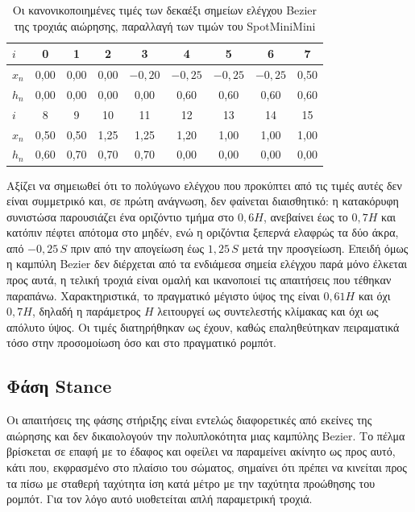 \documentclass[11pt]{report}
\begin{document}
\begin{table}[htbp]
    \centering
    \small
    \setlength{\tabcolsep}{4pt}
    \begin{tabular}{@{}l *{8}{c}@{}}
        \toprule
        $i$ & 0 & 1 & 2 & 3 & 4 & 5 & 6 & 7 \\
        \midrule
        $x_n$ & 0,00 & 0,00 & 0,00 & $-0{,}20$ & $-0{,}25$ & $-0{,}25$ & $-0{,}25$ & 0,50 \\
        $h_n$ & 0,00 & 0,00 & 0,00 & 0,00 & 0,60 & 0,60 & 0,60 & 0,60 \\
        \midrule
        $i$ & 8 & 9 & 10 & 11 & 12 & 13 & 14 & 15 \\
        \midrule
        $x_n$ & 0,50 & 0,50 & 1,25 & 1,25 & 1,20 & 1,00 & 1,00 & 1,00 \\
        $h_n$ & 0,60 & 0,70 & 0,70 & 0,70 & 0,00 & 0,00 & 0,00 & 0,00 \\
        \bottomrule
    \end{tabular}
    \caption[Κανονικοποιημένα σημεία ελέγχου Bezier της τροχιάς αιώρησης]{Οι
    κανονικοποιημένες τιμές των δεκαέξι σημείων ελέγχου Bezier της τροχιάς
    αιώρησης, παραλλαγή των τιμών του SpotMiniMini
    \cite{spotminimini2020github}}
    \label{tab:bezier-control-values}
\end{table}

Αξίζει να σημειωθεί ότι το πολύγωνο ελέγχου που προκύπτει από τις τιμές αυτές
δεν είναι συμμετρικό και, σε πρώτη ανάγνωση, δεν φαίνεται διαισθητικό: η
κατακόρυφη συνιστώσα παρουσιάζει ένα οριζόντιο τμήμα στο $0{,}6H$, ανεβαίνει
έως το $0{,}7H$ και κατόπιν πέφτει απότομα στο μηδέν, ενώ η οριζόντια ξεπερνά
ελαφρώς τα δύο άκρα, από $-0{,}25\,S$ πριν από την απογείωση έως $1{,}25\,S$ μετά
την προσγείωση. Επειδή όμως η καμπύλη
Bezier δεν διέρχεται από τα ενδιάμεσα σημεία ελέγχου παρά μόνο έλκεται προς
αυτά, η τελική τροχιά είναι ομαλή και ικανοποιεί τις απαιτήσεις που τέθηκαν
παραπάνω. Χαρακτηριστικά, το πραγματικό μέγιστο ύψος της είναι $0{,}61H$ και όχι
$0{,}7H$, δηλαδή η παράμετρος $H$ λειτουργεί ως συντελεστής κλίμακας και όχι ως
απόλυτο ύψος. Οι τιμές διατηρήθηκαν ως έχουν, καθώς επαληθεύτηκαν πειραματικά
τόσο στην προσομοίωση όσο και στο πραγματικό ρομπότ.

\subsection{Φάση Stance}
\label{subsec:stance-phase}
Οι απαιτήσεις της φάσης στήριξης είναι εντελώς διαφορετικές από εκείνες της
αιώρησης και δεν δικαιολογούν την πολυπλοκότητα μιας καμπύλης Bezier. Το πέλμα
βρίσκεται σε επαφή με το έδαφος και οφείλει να παραμείνει ακίνητο ως προς αυτό,
κάτι που, εκφρασμένο στο πλαίσιο του σώματος, σημαίνει ότι πρέπει να κινείται
προς τα πίσω με σταθερή ταχύτητα ίση κατά μέτρο με την ταχύτητα προώθησης του
ρομπότ. Για τον λόγο αυτό υιοθετείται απλή παραμετρική τροχιά.
\end{document}
